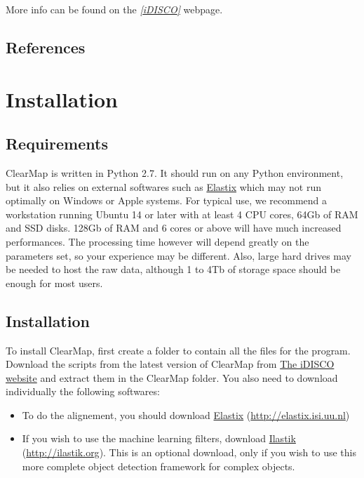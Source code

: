 \documentclass[letterpaper,10pt,english]{sphinxmanual}
\begin{document}
More info can be found on the \label{introduction:id8}{\hyperref[introduction:idisco]{\emph{{[}iDISCO{]}}}} webpage.


\subsection{References}
\label{introduction:references}

\section{Installation}
\label{installation:installation}\label{installation::doc}

\subsection{Requirements}
\label{installation:requirements}
ClearMap is written in Python 2.7. It should run on any Python environment, but it also relies on external softwares such as \href{http://elastix.isi.uu.nl}{Elastix} which may not run optimally on Windows or Apple systems.
For typical use, we recommend a workstation running Ubuntu 14 or later with at least 4 CPU cores, 64Gb of RAM and SSD disks. 128Gb of RAM and 6 cores or above will have much increased performances. The processing time however will depend greatly on the parameters set, so your experience may be different. Also, large hard drives may be needed to host the raw data, although 1 to 4Tb of storage space should be enough for most users.


\subsection{Installation}
\label{installation:id1}
To install ClearMap, first create a folder to contain all the files for the program. Download the scripts from the latest version of ClearMap from \href{https://www.idisco.info}{The iDISCO website} and extract them in the ClearMap folder. You also need to download individually the following softwares:
\begin{itemize}
\item {} 
To do the alignement, you should download \href{http://elastix.isi.uu.nl}{Elastix} (\href{http://elastix.isi.uu.nl}{http://elastix.isi.uu.nl})

\item {} 
If you wish to use the machine learning filters, download \href{http://ilastik.org}{Ilastik} (\href{http://ilastik.org}{http://ilastik.org}). This is an optional download, only if you wish to use this more complete object detection framework for complex objects.

\end{itemize}
\end{document}
